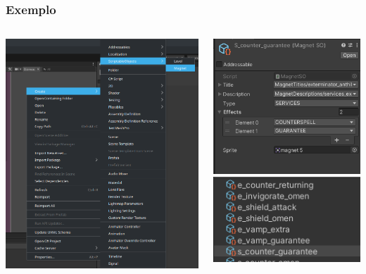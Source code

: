 \documentclass{beamer}
\begin{document}
	\begin{frame}
		\frametitle{Exemplo}
		\begin{columns}
			\includegraphics[scale=0.3]{so-rightclick}

			\includegraphics[scale=0.6]{so-inspector}
			\includegraphics[scale=0.6]{so-folder}
		\end{columns}
	\end{frame}
\end{document}
